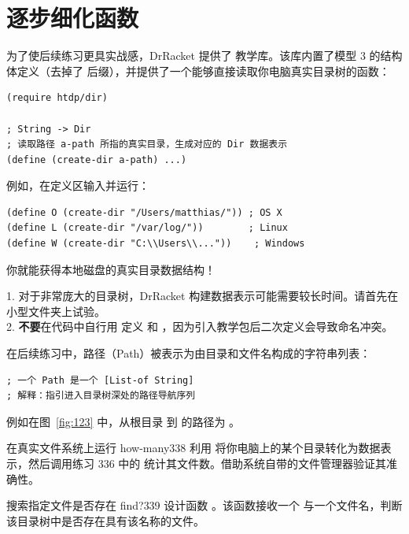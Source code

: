 \section{逐步细化函数}
\label{sec:20.3_refining_functions}

为了使后续练习更具实战感，DrRacket 提供了  教学库。该库内置了模型 3 的结构体定义（去掉了  后缀），并提供了一个能够直接读取你电脑真实目录树的函数：

\begin{lstlisting}[language=BSL]
(require htdp/dir)

; String -> Dir
; 读取路径 a-path 所指的真实目录，生成对应的 Dir 数据表示
(define (create-dir a-path) ...)
\end{lstlisting}

例如，在定义区输入并运行：
\begin{lstlisting}[language=BSL]
(define O (create-dir "/Users/matthias/")) ; OS X
(define L (create-dir "/var/log/"))        ; Linux
(define W (create-dir "C:\\Users\\..."))    ; Windows
\end{lstlisting}
你就能获得本地磁盘的真实目录数据结构！

\begin{notebox}[使用注意]
1. 对于非常庞大的目录树，DrRacket 构建数据表示可能需要较长时间。请首先在小型文件夹上试验。\\
2. \textbf{不要}在代码中自行用  定义  和 ，因为引入教学包后二次定义会导致命名冲突。
\end{notebox}

在后续练习中，路径（Path）被表示为由目录和文件名构成的字符串列表：
\begin{lstlisting}[language=BSL]
; 一个 Path 是一个 [List-of String]
; 解释：指引进入目录树深处的路径导航序列
\end{lstlisting}
例如在图~\ref{fig:123} 中，从根目录  到  的路径为 。

\begin{exercise}{在真实文件系统上运行 how-many}{338}
利用  将你电脑上的某个目录转化为数据表示，然后调用练习 336 中的  统计其文件数。借助系统自带的文件管理器验证其准确性。
\end{exercise}

\begin{exercise}{搜索指定文件是否存在 find?}{339}
设计函数 。该函数接收一个  与一个文件名，判断该目录树中是否存在具有该名称的文件。
\end{exercise}

